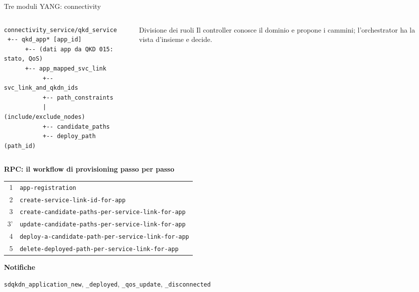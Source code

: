 \documentclass[10pt]{beamer}
\begin{document}
\begin{frame}[fragile]{Tre moduli YANG: connectivity}
  \begin{columns}[T]
    \begin{column}{0.52\textwidth}
\begin{lstlisting}[basicstyle=\ttfamily\fontsize{6}{6.8}\selectfont]
connectivity_service/qkd_service
 +-- qkd_app* [app_id]
      +-- (dati app da QKD 015: stato, QoS)
      +-- app_mapped_svc_link
           +-- svc_link_and_qkdn_ids
           +-- path_constraints
           |    (include/exclude_nodes)
           +-- candidate_paths
           +-- deploy_path (path_id)
\end{lstlisting}
    \end{column}
    \begin{column}{0.46\textwidth}
      \begin{block}{Divisione dei ruoli}
        \small Il controller conosce il dominio e \alert{propone} i
        cammini; l'orchestrator ha la vista d'insieme e \alert{decide}.
      \end{block}
    \end{column}
  \end{columns}
  \vspace{1ex}
  \textbf{RPC: il workflow di provisioning passo per passo}\par
      \vspace{0.5ex}
      \scriptsize
      \begin{tabular}{@{}r@{\ \ }l@{}}
        1 & \texttt{app-registration}\\
        2 & \texttt{create-service-link-id-for-app}\\
        3 & \texttt{create-candidate-paths-per-service-link-for-app}\\
        3' & \texttt{update-candidate-paths-per-service-link-for-app}\\
        4 & \texttt{deploy-a-candidate-path-per-service-link-for-app}\\
        5 & \texttt{delete-deployed-path-per-service-link-for-app}
      \end{tabular}
  \vspace{1ex}

  \textbf{Notifiche}\par
      \vspace{0.5ex}
      \scriptsize\texttt{sdqkdn\_application\_new}, \texttt{\_deployed},
      \texttt{\_qos\_update}, \texttt{\_disconnected}
\end{frame}
\end{document}
